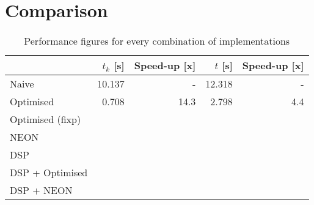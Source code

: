 \documentclass[final]{article}
\begin{document}
\section{Comparison}
\label{sec:comparison}

\begin{table}[H]
	\centering
	\caption{Performance figures for every combination of implementations}
	\begin{tabular}{lrrrr}
		\toprule
							& $t_k$ [s]	& Speed-up [x]	& $t$ [s]	& Speed-up [x]	\\
		\midrule
		Naive				& 10.137	& -			 	& 12.318	& -				\\
		Optimised			&  0.708	& 14.3		 	&  2.798	& 4.4			\\
		Optimised (fixp)	& 			& 			 	& 			& 				\\
		NEON				& 			& 			 	& 			& 				\\
		DSP					& 			& 			 	& 			& 				\\
		DSP + Optimised		& 			& 			 	& 			& 				\\
		DSP + NEON			& 			& 			 	& 			& 				\\
		\bottomrule
	\end{tabular}
	\label{tab:comparison}
\end{table}
\end{document}
